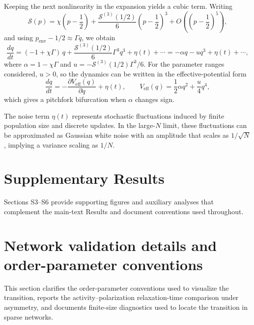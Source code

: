 \documentclass[11pt]{article}
\begin{document}
Keeping the next nonlinearity in the expansion yields a cubic term. Writing
\begin{equation}
\mathcal{S}(p)=\chi\left(p-\frac{1}{2}\right)+\frac{\mathcal{S}^{(3)}(1/2)}{6}\left(p-\frac{1}{2}\right)^3+O\!\left(\left(p-\frac{1}{2}\right)^5\right),
\end{equation}
and using $p_{\text{env}}-1/2\approx \Gamma q$, we obtain
\begin{equation}
\frac{dq}{dt}=(-1+\chi\Gamma)\,q+\frac{\mathcal{S}^{(3)}(1/2)}{6}\Gamma^3 q^3+\eta(t)+\cdots
=-\alpha q-u q^3+\eta(t)+\cdots,
\end{equation}
where $\alpha=1-\chi\Gamma$ and $u=-\mathcal{S}^{(3)}(1/2)\Gamma^3/6$. For the parameter ranges considered, $u>0$, so the dynamics can be written in the effective-potential form
\begin{equation}
\frac{dq}{dt}=-\frac{\partial V_{\text{eff}}(q)}{\partial q}+\eta(t),\qquad
V_{\text{eff}}(q)=\frac{1}{2}\alpha q^2+\frac{u}{4}q^4,
\end{equation}
which gives a pitchfork bifurcation when $\alpha$ changes sign.

The noise term $\eta(t)$ represents stochastic fluctuations induced by finite population size and discrete updates. In the large-$N$ limit, these fluctuations can be approximated as Gaussian white noise with an amplitude that scales as $1/\sqrt{N}$, implying a variance scaling as $1/N$.
\FloatBarrier

\section*{Supplementary Results}
\noindent Sections S3--S6 provide supporting figures and auxiliary analyses that complement the main-text Results and document conventions used throughout.
\FloatBarrier

\section{Network validation details and order-parameter conventions}
\label{supp:s3-theory-network}

This section clarifies the order-parameter conventions used to visualize the transition, reports the activity--polarization relaxation-time comparison under asymmetry, and documents finite-size diagnostics used to locate the transition in sparse networks.
\end{document}
